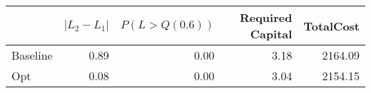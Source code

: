 \begin{tabular}{lrrrr}
\toprule
{} &  $|L_2 - L_1|$ &  $P(L > Q(0.6))$ &  Required Capital &  TotalCost \\
\midrule
Baseline &       0.89 &             0.00 &              3.18 &    2164.09 \\
Opt      &       0.08 &             0.00 &              3.04 &    2154.15 \\
\bottomrule
\end{tabular}

